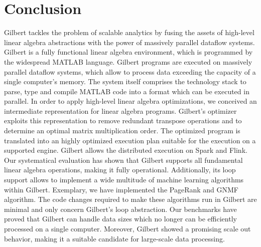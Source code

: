 \section{Conclusion}
\label{sec:conclusion}

Gilbert tackles the problem of scalable analytics by fusing the assets of high-level linear algebra abstractions with the power of massively parallel dataflow systems. Gilbert is a fully functional linear algebra environment, which is programmed by the widespread MATLAB language. Gilbert programs are executed on massively parallel dataflow systems, which allow to process data exceeding the capacity of a single computer's memory. The system itself comprises the technology stack to parse, type and compile MATLAB code into a format which can be executed in parallel. In order to apply high-level linear algebra optimizations, we conceived an intermediate representation for linear algebra programs. Gilbert's optimizer exploits this representation to remove redundant transpose operations and to determine an optimal matrix multiplication order. The optimized program is translated into an highly optimized execution plan suitable for the execution on a supported engine. Gilbert allows the distributed execution on Spark and Flink. Our systematical evaluation has shown that Gilbert supports all fundamental linear algebra operations, making it fully operational.
Additionally, its loop support allows to implement a wide multitude of machine learning algorithms within Gilbert.
Exemplary, we have implemented the PageRank and GNMF algorithm.
The code changes required to make these algorithms run in Gilbert are minimal and only concern Gilbert's loop abstraction.
Our benchmarks have proved that Gilbert can handle data sizes which no longer can be efficiently processed on a single computer.
Moreover, Gilbert showed a promising scale out behavior, making it a suitable candidate for large-scale data processing.

